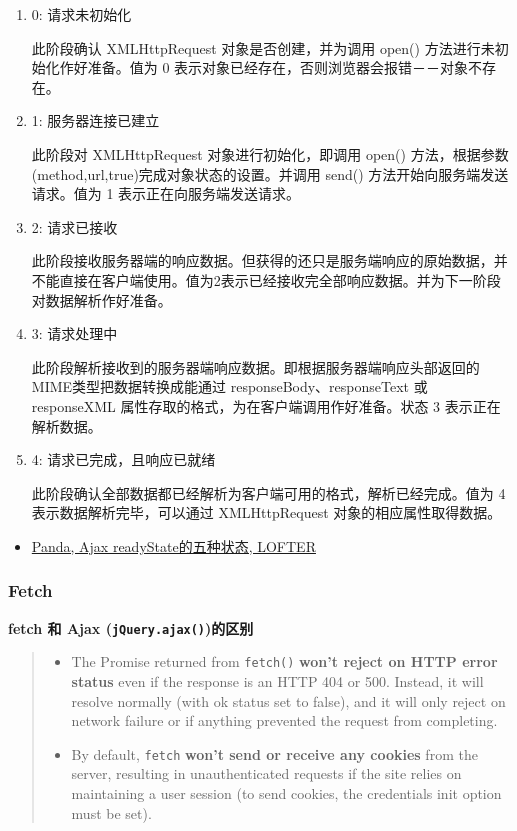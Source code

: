\begin{enumerate}
\def\labelenumi{\arabic{enumi}.}
\item
  0: 请求未初始化

  此阶段确认 XMLHttpRequest 对象是否创建，并为调用 open()
  方法进行未初始化作好准备。值为 0
  表示对象已经存在，否则浏览器会报错－－对象不存在。
\item
  1: 服务器连接已建立

  此阶段对 XMLHttpRequest 对象进行初始化，即调用 open() 方法，根据参数
  (method,url,true)完成对象状态的设置。并调用 send()
  方法开始向服务端发送请求。值为 1 表示正在向服务端发送请求。
\item
  2: 请求已接收

  此阶段接收服务器端的响应数据。但获得的还只是服务端响应的原始数据，并不能直接在客户端使用。值为2表示已经接收完全部响应数据。并为下一阶段对数据解析作好准备。
\item
  3: 请求处理中

  此阶段解析接收到的服务器端响应数据。即根据服务器端响应头部返回的MIME类型把数据转换成能通过
  responseBody、responseText 或 responseXML
  属性存取的格式，为在客户端调用作好准备。状态 3 表示正在解析数据。
\item
  4: 请求已完成，且响应已就绪

  此阶段确认全部数据都已经解析为客户端可用的格式，解析已经完成。值为 4
  表示数据解析完毕，可以通过 XMLHttpRequest 对象的相应属性取得数据。
\end{enumerate}

\begin{itemize}
\tightlist
\item
  \href{http://blog.163.com/freestyle_le/blog/static/183279448201269112527311/}{Panda,
  Ajax readyState的五种状态, LOFTER}
\end{itemize}

\subsubsection{Fetch}\label{fetch}

\textbf{fetch 和 Ajax (\lstinline!jQuery.ajax()!)的区别}

\begin{quote}
\begin{itemize}
\tightlist
\item
  The Promise returned from \lstinline!fetch()! \textbf{won't reject on
  HTTP error status} even if the response is an HTTP 404 or 500.
  Instead, it will resolve normally (with ok status set to false), and
  it will only reject on network failure or if anything prevented the
  request from completing.
\item
  By default, \lstinline!fetch! \textbf{won't send or receive any
  cookies} from the server, resulting in unauthenticated requests if the
  site relies on maintaining a user session (to send cookies, the
  credentials init option must be set).
\end{itemize}
\end{quote}

